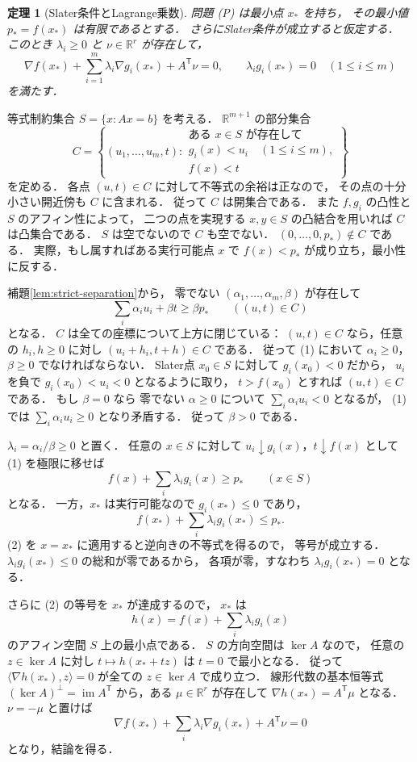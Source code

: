 \documentclass[a5paper,10pt,onecolumn]{jsarticle}
\makeatletter
\theoremstyle{mathnotetheorem}
\newtheorem{theorem}{定理}[section]
\renewcommand{\proofname}{証明}
\renewenvironment{proof}[1][\proofname]{%
  \par\pushQED{\qed}\normalfont\topsep4\p@\@plus2\p@\relax
  \trivlist\item[\hskip\labelsep\bfseries #1]\ignorespaces
}{\popQED\endtrivlist\@endpefalse}
\makeatother
\begin{document}
\begin{theorem}[Slater条件とLagrange乗数]\label{thm:slater}
問題 (P) は最小点 $x_*$ を持ち，
その最小値 $p_*=f(x_*)$ は有限であるとする．
さらにSlater条件が成立すると仮定する．
このとき
$\lambda_i\ge0$ と $\nu\in\mathbb R^r$ が存在して，
\[
 \nabla f(x_*)+
 \sum_{i=1}^m\lambda_i\nabla g_i(x_*)+
 A^{\mathsf T}\nu=0,
 \qquad
 \lambda_i g_i(x_*)=0\quad(1\le i\le m)
\]
を満たす．
\end{theorem}
\begin{proof}
等式制約集合 $S=\{x:Ax=b\}$ を考える．
$\mathbb R^{m+1}$ の部分集合
\[
 C=\left\{(u_1,\dots,u_m,t):
 \begin{array}{l}
 \text{ある }x\in S\text{ が存在して}\\
 g_i(x)<u_i\quad(1\le i\le m),\\
 f(x)<t
 \end{array}\right\}
\]
を定める．
各点 $(u,t)\in C$ に対して不等式の余裕は正なので，
その点の十分小さい開近傍も $C$ に含まれる．
従って $C$ は開集合である．
また $f,g_i$ の凸性と $S$ のアフィン性によって，
二つの点を実現する $x,y\in S$ の凸結合を用いれば
$C$ は凸集合である．
$S$ は空でないので $C$ も空でない．
$(0,\dots,0,p_*)\notin C$ である．
実際，もし属すればある実行可能点 $x$ で
$f(x)<p_*$ が成り立ち，最小性に反する．

補題\ref{lem:strict-separation}から，
零でない $(\alpha_1,\dots,\alpha_m,\beta)$ が存在して
\[
 \sum_i\alpha_i u_i+\beta t\ge\beta p_*
 \qquad((u,t)\in C)
 \tag{1}
\]
となる．
$C$ は全ての座標について上方に閉じている：
$(u,t)\in C$ なら，任意の $h_i,h\ge0$ に対し
$(u_i+h_i,t+h)\in C$ である．
従って (1) において
$\alpha_i\ge0$，$\beta\ge0$ でなければならない．
Slater点 $x_0\in S$ に対して
$g_i(x_0)<0$ だから，
$u_i$ を負で $g_i(x_0)<u_i<0$ となるように取り，
$t>f(x_0)$ とすれば $(u,t)\in C$ である．
もし $\beta=0$ なら
零でない $\alpha\ge0$ について
$\sum_i\alpha_i u_i<0$ となるが，
(1) では $\sum_i\alpha_i u_i\ge0$ となり矛盾する．
従って $\beta>0$ である．

$\lambda_i=\alpha_i/\beta\ge0$ と置く．
任意の $x\in S$ に対して
$u_i\downarrow g_i(x)$，$t\downarrow f(x)$ として
(1) を極限に移せば
\[
 f(x)+\sum_i\lambda_i g_i(x)\ge p_*
 \qquad(x\in S)
 \tag{2}
\]
となる．
一方，$x_*$ は実行可能なので
$g_i(x_*)\le0$ であり，
\[
 f(x_*)+\sum_i\lambda_i g_i(x_*)\le p_*.
\]
(2) を $x=x_*$ に適用すると逆向きの不等式を得るので，
等号が成立する．
$\lambda_i g_i(x_*)\le0$ の総和が零であるから，
各項が零，すなわち
$\lambda_i g_i(x_*)=0$ となる．

さらに (2) の等号を $x_*$ が達成するので，
$x_*$ は
\[
 h(x)=f(x)+\sum_i\lambda_i g_i(x)
\]
のアフィン空間 $S$ 上の最小点である．
$S$ の方向空間は $\ker A$ なので，
任意の $z\in\ker A$ に対し
$t\mapsto h(x_*+tz)$ は $t=0$ で最小となる．
従って
$\langle\nabla h(x_*),z\rangle=0$
が全ての $z\in\ker A$ で成り立つ．
線形代数の基本恒等式
$(\ker A)^\perp=\operatorname{im}A^{\mathsf T}$
から，ある $\mu\in\mathbb R^r$ が存在して
$\nabla h(x_*)=A^{\mathsf T}\mu$ となる．
$\nu=-\mu$ と置けば
\[
 \nabla f(x_*)+\sum_i\lambda_i\nabla g_i(x_*)
 +A^{\mathsf T}\nu=0
\]
となり，結論を得る．
\end{proof}
\end{document}
